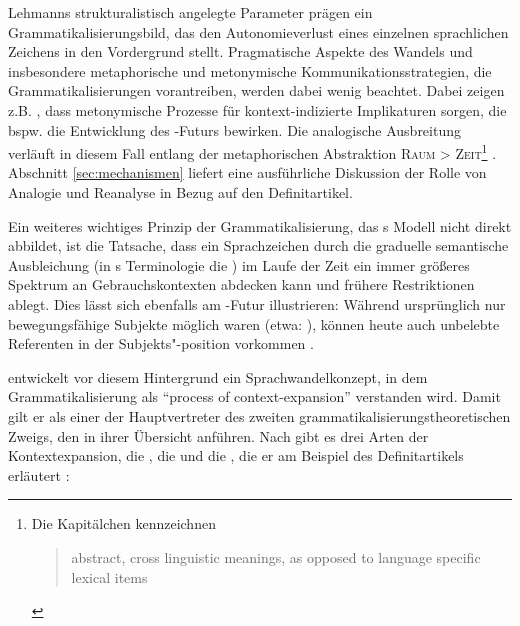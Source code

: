 Lehmanns strukturalistisch angelegte Parameter prägen ein Grammatikalisierungsbild, das den Autonomieverlust eines einzelnen sprachlichen Zeichens in den Vordergrund stellt. Pragmatische Aspekte des Wandels und insbesondere metaphorische und metonymische Kommunikationsstrategien, die Grammatikalisierungen vorantreiben, werden dabei wenig beachtet. Dabei zeigen z.B. \textcite[84--93]{Hopper2006}, dass metonymische Prozesse für kontext-indizierte Implikaturen sorgen, die bspw. die Entwicklung des -Futurs bewirken. Die analogische Ausbreitung verläuft in diesem Fall entlang der metaphorischen Abstraktion \textsc{Raum > Zeit}\footnote{Die Kapitälchen kennzeichnen \blockcquote[85]{Hopper2006}{abstract, cross linguistic meanings, as opposed to language specific lexical items}.} \parencite[s. auch][45-46]{Heine1991}. Abschnitt \ref{sec:mechanismen} liefert eine ausführliche Diskussion der Rolle von Analogie und Reanalyse in Bezug auf den Definitartikel. 

Ein weiteres wichtiges Prinzip der Grammatikalisierung, das \citeauthor{Lehmann1995}s Modell nicht direkt abbildet, ist die Tatsache, dass ein Sprachzeichen durch die graduelle semantische Ausbleichung  (in \citeauthor{Lehmann1995}s  Terminologie die ) im Laufe der Zeit ein immer größeres Spektrum an Gebrauchskontexten abdecken kann und frühere Restriktionen ablegt. Dies lässt sich ebenfalls am -Futur illustrieren: Während ursprünglich  nur bewegungsfähige Subjekte möglich waren (etwa: ), können heute auch unbelebte Referenten in der Subjekts"-position vorkommen \parencite[etwa: ; Beispiele nach][5--6]{Bybee1994}. 

\textcite{Himmelmann1997,Himmelmann2004} entwickelt vor diesem Hintergrund ein Sprachwandelkonzept, in dem Grammatikalisierung als "`process of context-expansion"'\linebreak \parencite[32]{Himmelmann2004} verstanden wird. Damit gilt er als einer der Hauptvertreter des zweiten grammatikalisierungstheoretischen Zweigs, den \textcite[105--109]{Traugott2013} in ihrer Übersicht anführen. Nach \citeauthor{Himmelmann2004} gibt es drei Arten der Kontextexpansion, die , die  und die , die er am Beispiel des Definitartikels erläutert \parencite[s.][32--33]{Himmelmann2004}: 

